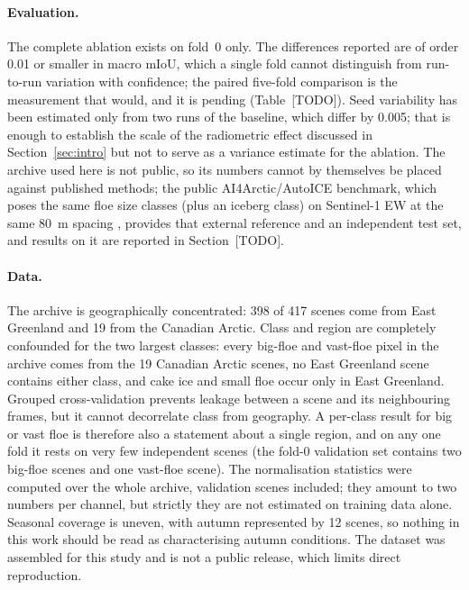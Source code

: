 \documentclass[preprint,12pt,authoryear]{elsarticle}
\begin{document}
\paragraph{Evaluation.} The complete ablation exists on fold~0 only. The
differences reported are of order 0.01 or smaller in macro mIoU, which a single
fold cannot distinguish from run-to-run variation with confidence; the paired
five-fold comparison is the measurement that would, and it is pending
(Table~[TODO]). Seed variability has been estimated only from two runs of the
baseline, which differ by 0.005; that is enough to establish the scale of the
radiometric effect discussed in Section~\ref{sec:intro} but not to serve as a
variance estimate for the ablation. The archive
used here is not public, so its numbers cannot by themselves be placed against
published methods; the public AI4Arctic/AutoICE benchmark, which poses the same
floe size classes (plus an iceberg class) on Sentinel-1 EW at the same 80~m spacing
\citep{stokholm2024autoice,buushinkler2023rttai4arctic}, provides that external
reference and an independent test set, and results on it are reported in
Section~[TODO].

\paragraph{Data.} The archive is geographically concentrated: 398 of 417 scenes
come from East Greenland and 19 from the Canadian Arctic. Class and region are
completely confounded for the two largest classes: every big-floe and
vast-floe pixel in the archive comes from the 19 Canadian Arctic scenes, no
East Greenland scene contains either class, and cake ice and small floe occur
only in East Greenland. Grouped cross-validation prevents leakage between a
scene and its neighbouring frames, but it cannot decorrelate class from
geography. A per-class result for big or vast floe is therefore also a
statement about a single region, and on any one fold it rests on very few
independent scenes (the fold-0 validation set contains two big-floe scenes and
one vast-floe scene). The normalisation statistics were computed over the whole
archive, validation scenes included; they amount to two numbers per channel,
but strictly they are not estimated on training data alone.
Seasonal coverage is uneven, with autumn represented by 12 scenes, so nothing
in this work should be read as characterising autumn conditions. The dataset was
assembled for this study and is not a public release, which limits direct
reproduction.
\end{document}
